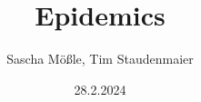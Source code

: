 \documentclass[oneside]{ausarbeitung}
\begin{document}

\Projektbericht

\Informatik

\title{Epidemics}

\author{Sascha Mö{\ss}le, Tim Staudenmaier}

\examinerIsAProfessortrue   %


\date{28.2.2024}



\maketitle
\cleardoublepage

\setcounter{page}{1}


\makeaffirmation
\cleardoublepage
\end{document}
